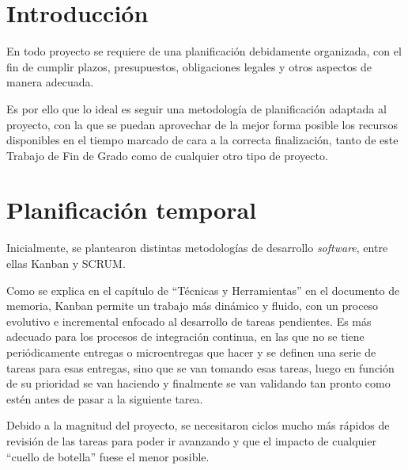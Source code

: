 
\section{Introducción}

En todo proyecto se requiere de una planificación debidamente organizada, con el fin de cumplir plazos, presupuestos, obligaciones legales y otros aspectos de manera adecuada. 

Es por ello que lo ideal es seguir una metodología de planificación adaptada al proyecto, con la que se puedan aprovechar de la mejor forma posible los recursos disponibles en el tiempo marcado de cara a la correcta finalización, tanto de este Trabajo de Fin de Grado como de cualquier otro tipo de proyecto.

\section{Planificación temporal}

Inicialmente, se plantearon distintas metodologías de desarrollo \textit{software}, entre ellas Kanban y SCRUM.

Como se explica en el capítulo de ``Técnicas y Herramientas'' en el documento de memoria, Kanban permite un trabajo más dinámico y fluido, con un proceso evolutivo e incremental enfocado al desarrollo de tareas pendientes. Es más adecuado para los procesos de integración continua, en las que no se tiene periódicamente entregas o microentregas que hacer y se definen una serie de tareas para esas entregas, sino que se van tomando esas tareas, luego en función de su prioridad se van haciendo y finalmente se van validando tan pronto como estén antes de pasar a la siguiente tarea.

Debido a la magnitud del proyecto, se necesitaron ciclos mucho más rápidos de revisión de las tareas para poder ir avanzando y que el impacto de cualquier ``cuello de botella'' fuese el menor posible.

